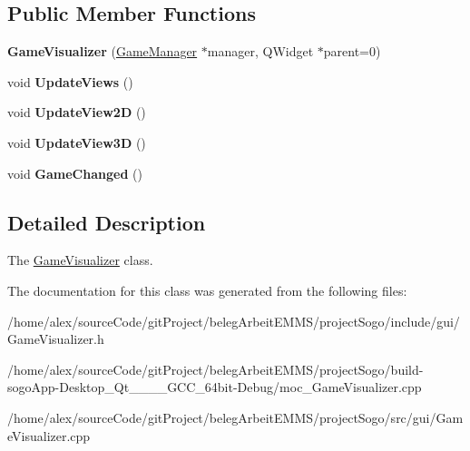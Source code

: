 \subsection*{Public Member Functions}
\begin{DoxyCompactItemize}
\item 
\hypertarget{classGameVisualizer_ac6e640e1cfa0162d63158670741d9485}{{\bfseries Game\-Visualizer} (\hyperlink{classGameManager}{Game\-Manager} $\ast$manager, Q\-Widget $\ast$parent=0)}\label{classGameVisualizer_ac6e640e1cfa0162d63158670741d9485}

\item 
\hypertarget{classGameVisualizer_ac68aa47882b34f28427e3e161f677f9d}{void {\bfseries Update\-Views} ()}\label{classGameVisualizer_ac68aa47882b34f28427e3e161f677f9d}

\item 
\hypertarget{classGameVisualizer_a5fb41e30e67173d36f3769d804130b19}{void {\bfseries Update\-View2\-D} ()}\label{classGameVisualizer_a5fb41e30e67173d36f3769d804130b19}

\item 
\hypertarget{classGameVisualizer_aee1fac4e1657fb4be1fa61f563b02d32}{void {\bfseries Update\-View3\-D} ()}\label{classGameVisualizer_aee1fac4e1657fb4be1fa61f563b02d32}

\item 
\hypertarget{classGameVisualizer_a3a8cf6d067d4d0272c1b3b60f44f8d1c}{void {\bfseries Game\-Changed} ()}\label{classGameVisualizer_a3a8cf6d067d4d0272c1b3b60f44f8d1c}

\end{DoxyCompactItemize}


\subsection{Detailed Description}
The \hyperlink{classGameVisualizer}{Game\-Visualizer} class. 

The documentation for this class was generated from the following files\-:\begin{DoxyCompactItemize}
\item 
/home/alex/source\-Code/git\-Project/beleg\-Arbeit\-E\-M\-M\-S/project\-Sogo/include/gui/Game\-Visualizer.\-h\item 
/home/alex/source\-Code/git\-Project/beleg\-Arbeit\-E\-M\-M\-S/project\-Sogo/build-\/sogo\-App-\/\-Desktop\-\_\-\-Qt\-\_\-\_\-\_\-\_\-\-G\-C\-C\-\_\-64bit-\/\-Debug/moc\-\_\-\-Game\-Visualizer.\-cpp\item 
/home/alex/source\-Code/git\-Project/beleg\-Arbeit\-E\-M\-M\-S/project\-Sogo/src/gui/Game\-Visualizer.\-cpp\end{DoxyCompactItemize}
